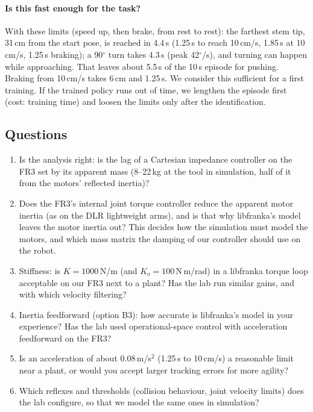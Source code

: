 \paragraph{Is this fast enough for the task?} With these limits (speed up, then brake, from rest to rest): the
farthest stem tip, 31\,cm from the start pose, is reached in 4.4\,s (1.25\,s to reach 10\,cm/s, 1.85\,s at
10\,cm/s, 1.25\,s braking); a 90$^\circ$ turn takes 4.3\,s (peak 42$^\circ$/s), and turning can happen while
approaching. That leaves about 5.5\,s of the 10\,s episode for pushing. Braking from 10\,cm/s takes 6\,cm and 1.25\,s.
We consider this sufficient for a first training. If the trained policy runs out of time, we lengthen the episode
first (cost: training time) and loosen the limits only after the identification.

\subsection{Questions}
\label{sec:al-questions}
\begin{enumerate}
  \item Is the analysis right: is the lag of a Cartesian impedance controller on the FR3 set by its apparent mass
        (8--22\,kg at the tool in simulation, half of it from the motors' reflected inertia)?
  \item Does the FR3's internal joint torque controller reduce the apparent motor inertia (as on the DLR
        lightweight arms), and is that why libfranka's model leaves the motor inertia out? This decides how the
        simulation must model the motors, and which mass matrix the damping of our controller should use on the
        robot.
  \item Stiffness: is $K = 1000$\,N/m (and $K_o = 100$\,N\,m/rad) in a libfranka torque loop acceptable on our FR3
        next to a plant? Has the lab run similar gains, and with which velocity filtering?
  \item Inertia feedforward (option B3): how accurate is libfranka's model in your experience? Has the lab used
        operational-space control with acceleration feedforward on the FR3?
  \item Is an acceleration of about 0.08\,m/s$^2$ (1.25\,s to 10\,cm/s) a reasonable limit near a plant, or would
        you accept larger tracking errors for more agility?
  \item Which reflexes and thresholds (collision behaviour, joint velocity limits) does the lab configure, so that we
        model the same ones in simulation?
\end{enumerate}

